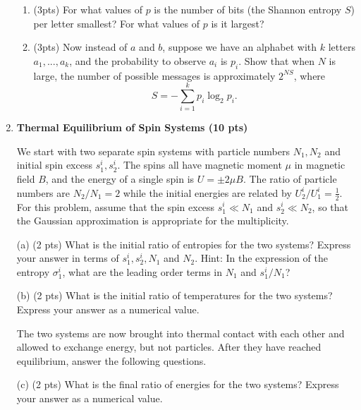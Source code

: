 \documentclass{article}
\theoremstyle{defi}
\begin{document}
\begin{enumerate}
\begin{enumerate}
            \item (3pts) For what values of $p$ is the number of bits (the Shannon entropy $S$) per letter smallest? For what values of $p$ is it largest?
            
            \item (3pts) Now instead of $a$ and $b$, suppose we have an alphabet with $k$ letters $a_1,...,a_k$, and the probability to observe $a_i$ is $p_i$. Show that when $N$ is large, the number of possible messages is approximately $2^{N S}$, where
            \begin{equation}
                S = - \sum_{i=1}^k{p_i \log_2{p_i}}.
            \end{equation}
        \end{enumerate}
        
    \vspace{15mm}
    
    \item \textbf{Thermal Equilibrium of Spin Systems (10 pts)} 
        
        We start with two separate spin systems with particle numbers $N_{1}, N_{2}$ and initial spin excess $s_{1}^{i}, s_{2}^{i}$. The spins all have magnetic moment $\mu$ in magnetic field $B$, and the energy of a single spin is $U=\pm 2 \mu B$. The ratio of particle numbers are $N_{2} / N_{1}=2$ while the initial energies are related by $U_{2}^{i} / U_{1}^{i}=\frac{1}{2}$. For this problem, assume that the spin excess $s_1^i\ll N_1$ and $s_2^i \ll N_2$, so that the Gaussian approximation is appropriate for the multiplicity.

            (a) (2 pts) What is the initial ratio of entropies for the two systems? Express your answer in terms of $s_1^i, s_2^i, N_1$ and $N_2$. Hint: In the expression of the entropy $\sigma_1^i$, what are the leading order terms in $N_1$ and $s_1^i/N_1$?
                
            (b) (2 pts) What is the initial ratio of temperatures for the two systems? Express your answer as a numerical value.
                
            \vspace{5mm}
            The two systems are now brought into thermal contact with each other and allowed to exchange energy, but not particles. After they have reached equilibrium, answer the following questions.
                
            (c) (2 pts) What is the final ratio of energies for the two systems? Express your answer as a numerical value.
                

\end{enumerate}
\end{document}
